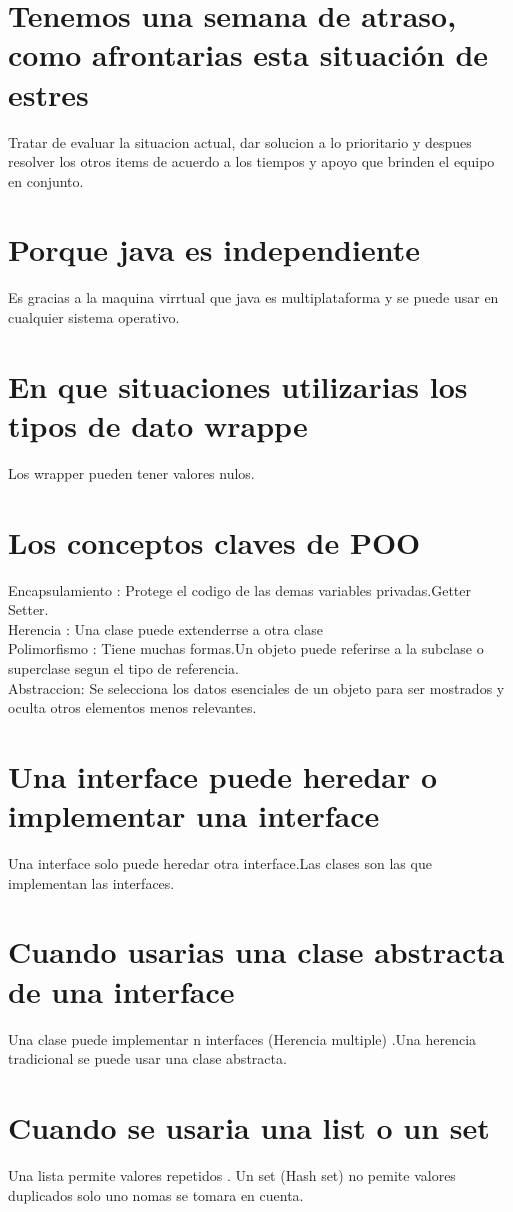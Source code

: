 \section{Tenemos una semana de atraso, como afrontarias esta situaci\'on de estres}
Tratar de evaluar la situacion actual, dar solucion a lo prioritario y despues resolver los otros items de acuerdo a los tiempos y apoyo que brinden el equipo en conjunto. 
\section{Porque java es independiente}
Es gracias a la maquina virrtual que java es multiplataforma y se puede usar en cualquier sistema operativo.
\section{En que situaciones utilizarias los tipos de dato wrappe} 
Los wrapper pueden tener valores nulos.
\section{Los conceptos claves de POO}
Encapsulamiento : Protege el codigo de las demas variables privadas.Getter Setter.\\
Herencia : Una clase puede extenderrse a otra clase\\
Polimorfismo : Tiene muchas formas.Un objeto puede referirse a la subclase o superclase segun el tipo de referencia.\\
Abstraccion: Se selecciona los datos esenciales de un objeto para ser mostrados y oculta otros elementos menos relevantes.
\section{Una interface puede heredar o implementar una interface}
Una interface solo puede heredar otra interface.Las clases son las que implementan las interfaces.
\section{Cuando usarias una clase abstracta de una interface}
Una clase puede implementar n interfaces (Herencia multiple) .Una herencia tradicional se puede usar una clase abstracta.
\section{Cuando se usaria una list o un set}
Una lista permite valores repetidos . Un set (Hash set) no pemite valores duplicados solo uno nomas se tomara en cuenta. 
